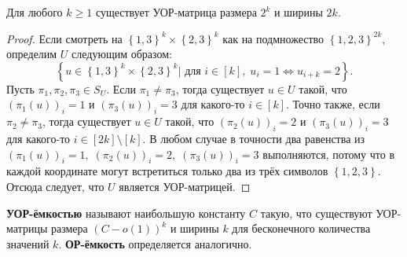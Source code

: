 \begin{prop}\label{prop:05:3.1}
  Для любого $k \geq 1$ существует УОР-матрица размера $2^k$ и ширины $2k$.
\end{prop}
\begin{proof}
	Если смотреть на $\left\{ 1,3 \right\}^k \times \left\{ 2,3 \right\}^k$ как на подмножество $\left\{ 1,2,3 \right\}^{2k}$, определим $U$ следующим образом:
	\[
		\left\{ u \in \left\{ 1,3 \right\}^k \times \left\{ 2,3 \right\}^k | \text{ для } i \in [k], \; u_i = 1 \iff u_{i+k} = 2 \right\}.
	\]
	Пусть $\pi_1, \pi_2, \pi_3 \in S_U$. Если $\pi_1 \neq \pi_3$, тогда существует $u \in U$ такой, что $\left( \pi_1(u) \right)_i = 1$ и $\left( \pi_3(u) \right)_i = 3$ для
	какого-то $i \in [k]$. Точно также, если $\pi_2 \neq \pi_3$, тогда существует $u \in U$ такой, что $\left( \pi_2(u) \right)_i = 2$ и $\left( \pi_3(u) \right)_i = 3$ для
	какого-то $i \in [2k]\setminus[k]$. В любом случае в точности два равенства из $\left( \pi_1(u) \right)_i = 1,\; \left( \pi_2(u) \right)_i = 2,\; \left( \pi_3(u) \right)_i = 3$ выполняются, потому что в каждой координате могут встретиться только два из трёх символов $\left\{ 1,2,3 \right\}$. Отсюда следует, что $U$ является УОР-матрицей. 
\end{proof}

\begin{definition}
  \textbf{УОР-ёмкостью} называют наибольшую константу $C$ такую, что существуют УОР-матрицы размера $(C - o(1))^k$ и ширины $k$ для бесконечного количества значений $k$. \textbf{ОР-ёмкость} определяется аналогично.
\end{definition}

